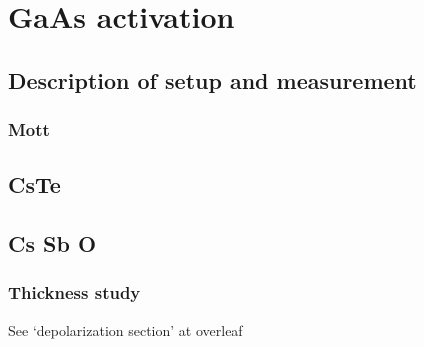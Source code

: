 \chapter{GaAs activation}
\section{Description of setup and measurement}
\subsection{Mott}
\section{CsTe}
\section{Cs Sb O}
\subsection{Thickness study}
See `depolarization section' at overleaf